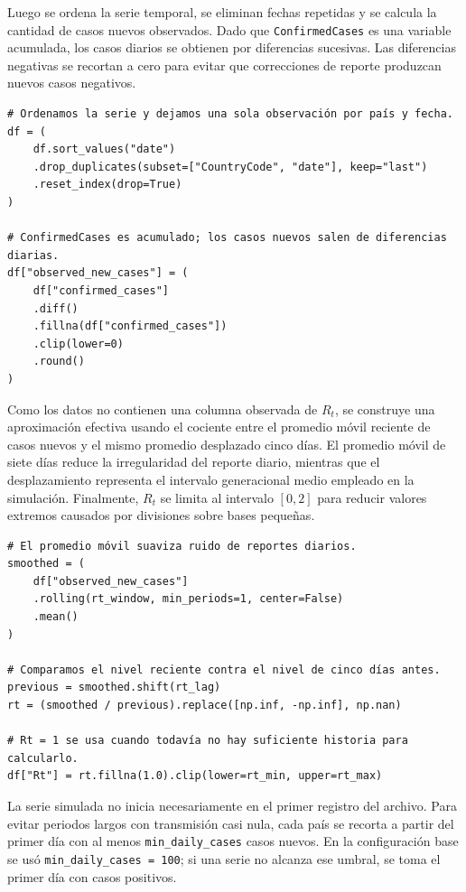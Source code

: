 \documentclass[12pt]{article}
\begin{document}
Luego se ordena la serie temporal, se eliminan fechas repetidas y se calcula la
cantidad de casos nuevos observados. Dado que \texttt{ConfirmedCases} es una
variable acumulada, los casos diarios se obtienen por diferencias sucesivas.
Las diferencias negativas se recortan a cero para evitar que correcciones de
reporte produzcan nuevos casos negativos.

\begin{lstlisting}[caption={Cálculo de casos nuevos observados.},label={lst:new-cases}]
# Ordenamos la serie y dejamos una sola observación por país y fecha.
df = (
    df.sort_values("date")
    .drop_duplicates(subset=["CountryCode", "date"], keep="last")
    .reset_index(drop=True)
)

# ConfirmedCases es acumulado; los casos nuevos salen de diferencias diarias.
df["observed_new_cases"] = (
    df["confirmed_cases"]
    .diff()
    .fillna(df["confirmed_cases"])
    .clip(lower=0)
    .round()
)
\end{lstlisting}

Como los datos no contienen una columna observada de \(R_t\), se construye una
aproximación efectiva usando el cociente entre el promedio móvil reciente de
casos nuevos y el mismo promedio desplazado cinco días. El promedio móvil de
siete días reduce la irregularidad del reporte diario, mientras que el
desplazamiento representa el intervalo generacional medio empleado en la
simulación. Finalmente, \(R_t\) se limita al intervalo \([0,2]\) para reducir
valores extremos causados por divisiones sobre bases pequeñas.

\begin{lstlisting}[caption={Estimación efectiva de \(R_t\).},label={lst:rt-estimation}]
# El promedio móvil suaviza ruido de reportes diarios.
smoothed = (
    df["observed_new_cases"]
    .rolling(rt_window, min_periods=1, center=False)
    .mean()
)

# Comparamos el nivel reciente contra el nivel de cinco días antes.
previous = smoothed.shift(rt_lag)
rt = (smoothed / previous).replace([np.inf, -np.inf], np.nan)

# Rt = 1 se usa cuando todavía no hay suficiente historia para calcularlo.
df["Rt"] = rt.fillna(1.0).clip(lower=rt_min, upper=rt_max)
\end{lstlisting}

La serie simulada no inicia necesariamente en el primer registro del archivo.
Para evitar periodos largos con transmisión casi nula, cada país se recorta a
partir del primer día con al menos \texttt{min\_daily\_cases} casos nuevos. En
la configuración base se usó \texttt{min\_daily\_cases = 100}; si una serie no
alcanza ese umbral, se toma el primer día con casos positivos.
\end{document}

